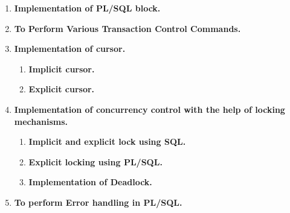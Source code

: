 \documentclass[12pt,a4paper]{report}
\begin{document}
\begin{enumerate}
	\item{ \fontsize{14}{12} \textbf{Implementation of PL/SQL block.} }	
	\clearpage
	\newpage

	\item{ \fontsize{14}{12} \textbf{To Perform Various Transaction Control Commands.} }	
	\clearpage
	\newpage

	\item{ \fontsize{14}{12} \textbf{Implementation of cursor.} }{
		\begin{enumerate}
			\item{ \fontsize{14}{12} \textbf{Implicit cursor.}}
			\item{ \fontsize{14}{12} \textbf{Explicit cursor.}}			
		\end{enumerate}
		}
	\clearpage
	\newpage	
		
	\item{ \fontsize{14}{12} \textbf{Implementation of concurrency control with the help of locking mechanisms.} }{
		\begin{enumerate}
			\item{ \fontsize{14}{12} \textbf{Implicit and explicit lock using SQL.}}
			\item{ \fontsize{14}{12} \textbf{Explicit locking using PL/SQL.}}			
			\item{ \fontsize{14}{12} \textbf{Implementation of Deadlock.}}						
		\end{enumerate}
	}
	\clearpage
	\newpage
	
	\item{ \fontsize{14}{12} \textbf{To perform Error handling in PL/SQL.} }					
	\clearpage
	\newpage
	

\end{enumerate}
\end{document}
